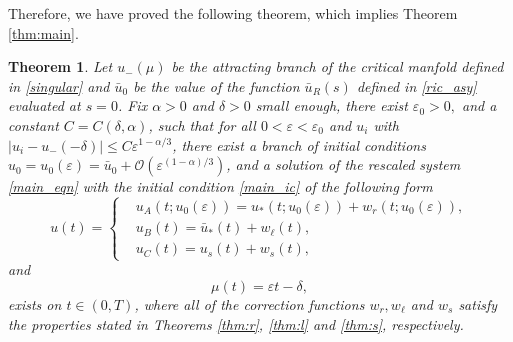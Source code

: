 \documentclass[letterpaper,11pt]{article}
\newcommand{\rmO}{\mathcal{O}}
\newcommand{\eps}{\varepsilon}
\numberwithin{equation}{section}
\theoremstyle{plain}
\newtheorem{theorem}{Theorem}[section]
\begin{document}
Therefore, we have proved the following theorem, which implies Theorem \ref{thm:main}.
\begin{theorem}\label{thm:glue}
Let $u_-(\mu)$ be the attracting branch of the critical manfold defined in \eqref{singular} and $\bar{u}_0$ be the value of the function $\bar{u}_R(s)$ defined in \eqref{ric_asy} evaluated at $s=0$.
Fix $\alpha>0$ and $\delta>0$ small enough, there exist $\eps_0>0,$ and a constant $C=C(\delta,\alpha)$, such that for all $0<\eps<\eps_0$ and $u_i$ with $|u_i - u_-(-\delta)| \le C\eps^{1-\alpha/3}$, there exist a branch of initial conditions $u_0= u_0(\eps) = \bar{u}_0 + \rmO(\eps^{(1-\alpha)/3})$, and a solution of the rescaled system 
\eqref{main_eqn} with the initial condition
\eqref{main_ic} of the following form
\begin{equation}
u(t)=\begin{cases}
&u_A(t; u_0(\eps))= u_*(t;u_0(\eps)) + w_r(t;u_0(\eps)), \\
&u_B(t)=\bar{u}_*(t) + w_\ell(t), \\
&u_C(t)=u_s(t) + w_s(t),
\end{cases}
\end{equation}
and 
\begin{equation}
\mu(t) = \eps t -\delta,
\end{equation}
exists on $t \in (0,T)$, where all of the correction functions $w_r, w_\ell$ and $w_s$ satisfy the properties stated in Theorems \ref{thm:r}, \ref{thm:l} and \ref{thm:s}, respectively.
\end{theorem}
\end{document}
